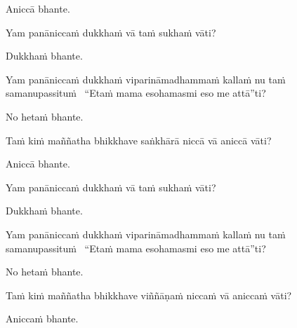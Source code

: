 \begin{pali-hangtogether}
  Aniccā bhante.
\end{pali-hangtogether}

\begin{pali-hangtogether}
  Yam panāniccaṁ dukkhaṁ vā taṁ sukhaṁ vāti?
\end{pali-hangtogether}

\begin{pali-hangtogether}
  Dukkhaṁ bhante.
\end{pali-hangtogether}

\begin{pali-hangtogether}
  Yam panāniccaṁ dukkhaṁ viparināmadhammaṁ kallaṁ nu taṁ samanupassituṁ \breathmark\ ``Etaṁ mama esohamasmi eso me attā''ti?
\end{pali-hangtogether}

\begin{pali-hangtogether}
  No hetaṁ bhante.
\end{pali-hangtogether}

\begin{pali-hang}
  Taṁ kiṁ maññatha bhikkhave saṅkhārā niccā vā aniccā vāti?
\end{pali-hang}

\begin{pali-hangtogether}
  Aniccā bhante.
\end{pali-hangtogether}

\begin{pali-hangtogether}
  Yam panāniccaṁ dukkhaṁ vā taṁ sukhaṁ vāti?
\end{pali-hangtogether}

\begin{pali-hangtogether}
  Dukkhaṁ bhante.
\end{pali-hangtogether}

\begin{pali-hangtogether}
  Yam panāniccaṁ dukkhaṁ viparināmadhammaṁ kallaṁ nu taṁ samanupassituṁ \breathmark\ ``Etaṁ mama esohamasmi eso me attā''ti?
\end{pali-hangtogether}

\begin{pali-hangtogether}
  No hetaṁ bhante.
\end{pali-hangtogether}

\begin{pali-hang}
  Taṁ kiṁ maññatha bhikkhave viññāṇaṁ niccaṁ vā aniccaṁ vāti?
\end{pali-hang}

\begin{pali-hangtogether}
  Aniccaṁ bhante.
\end{pali-hangtogether}

